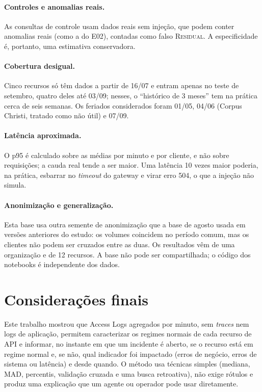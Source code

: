 \documentclass[sigconf,nonacm]{acmart}
\newcommand{\Residual}{\textsc{Residual}\xspace}
\begin{document}
\paragraph{Controles e anomalias reais.} As consultas de controle usam dados reais sem injeção, que podem conter anomalias reais (como a do E02), contadas como falso \Residual. A especificidade é, portanto, uma estimativa conservadora.

\paragraph{Cobertura desigual.} Cinco recursos só têm dados a partir de 16/07 e entram apenas no teste de setembro, quatro deles até 03/09; nesses, o ``histórico de 3 meses'' tem na prática cerca de seis semanas. Os feriados considerados foram 01/05, 04/06 (Corpus Christi, tratado como não útil) e 07/09.

\paragraph{Latência aproximada.} O p95 é calculado sobre as médias por minuto e por cliente, e não sobre requisições; a cauda real tende a ser maior. Uma latência 10 vezes maior poderia, na prática, esbarrar no \emph{timeout} do gateway e virar erro 504, o que a injeção não simula.

\paragraph{Anonimização e generalização.} Esta base usa outra semente de anonimização que a base de agosto usada em versões anteriores do estudo: os volumes coincidem no período comum, mas os clientes não podem ser cruzados entre as duas. Os resultados vêm de uma organização e de 12 recursos. A base não pode ser compartilhada; o código dos notebooks é independente dos dados.

\section{Considerações finais}\label{sec:conclusao}

Este trabalho mostrou que Access Logs agregados por minuto, sem \emph{traces} nem logs de aplicação, permitem caracterizar os regimes normais de cada recurso de API e informar, no instante em que um incidente é aberto, se o recurso está em regime normal e, se não, qual indicador foi impactado (erros de negócio, erros de sistema ou latência) e desde quando. O método usa técnicas simples (mediana, MAD, percentis, validação cruzada e uma busca retroativa), não exige rótulos e produz uma explicação que um agente ou operador pode usar diretamente.
\end{document}

